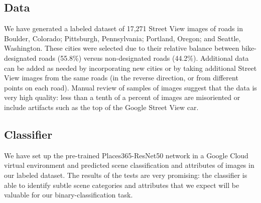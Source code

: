 \documentclass[10pt,twocolumn,letterpaper]{article}
\begin{document}
\subsection{Data}

We have generated a labeled dataset of 17,271 Street View images of roads in Boulder, Colorado; Pittsburgh, Pennsylvania; Portland, Oregon; and Seattle, Washington. These cities were selected due to their relative balance between bike-designated roads (55.8\%) versus non-designated roads (44.2\%). Additional data can be added as needed by incorporating new cities or by taking additional Street View images from the same roads (in the reverse direction, or from different points on each road). Manual review of samples of images suggest that the data is very high quality: less than a tenth of a percent of images are misoriented or include artifacts such as the top of the Google Street View car. 

\subsection{Classifier}

We have set up the pre-trained Places365-ResNet50 network in a Google Cloud virtual environment and predicted scene classification and attributes of images in our labeled dataset. The results of the tests are very promising: the classifier is able to identify subtle scene categories and attributes that we expect will be valuable for our binary-classification task.

{\small


}
\end{document}
